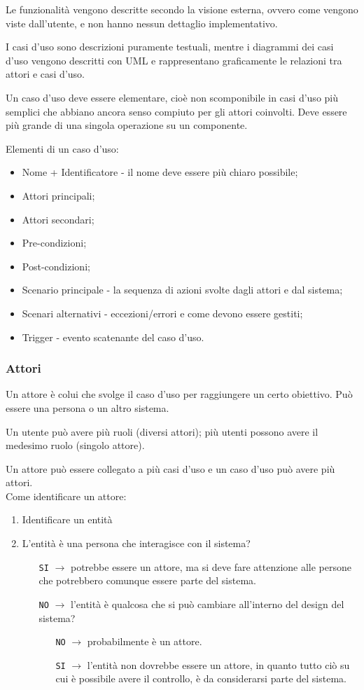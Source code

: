 Le funzionalità vengono descritte secondo la visione esterna, ovvero come vengono viste dall'utente, e non hanno nessun dettaglio implementativo.

I casi d'uso sono descrizioni puramente testuali, mentre i diagrammi dei casi d'uso vengono descritti con UML e rappresentano graficamente le relazioni tra attori e casi d'uso.

Un caso d'uso deve essere elementare, cioè non scomponibile in casi d'uso più semplici che abbiano ancora senso compiuto per gli attori coinvolti. 
Deve essere più grande di una singola operazione su un componente. 

Elementi di un caso d'uso:
\begin{itemize}
\item Nome + Identificatore - il nome deve essere più chiaro possibile;
\item Attori principali;
\item Attori secondari;
\item Pre-condizioni;
\item Post-condizioni; 
\item Scenario principale - la sequenza di azioni svolte dagli attori e dal sistema;
\item Scenari alternativi - eccezioni/errori e come devono essere gestiti;
\item Trigger - evento scatenante del caso d'uso.
\end{itemize}

\subsubsection{Attori}

Un attore è colui che svolge il caso d'uso per raggiungere un certo obiettivo. Può essere una persona o un altro sistema. 

Un utente può avere più ruoli (diversi attori); più utenti possono avere il medesimo ruolo (singolo attore). 

Un attore può essere collegato a più casi d'uso e un caso d'uso può avere più attori. \\
Come identificare un attore:
\begin{enumerate}
\item Identificare un entità
\item L'entità è una persona che interagisce con il sistema?
\begin{itemize}
\item[\texttt{SI}] $\to$ potrebbe essere un attore, ma si deve fare attenzione alle persone che potrebbero comunque essere parte del sistema.
\item[\texttt{NO}] $\to$ l'entità è qualcosa che si può cambiare all'interno del design del sistema?
\begin{itemize}
\item[\texttt{NO}] $\to$ probabilmente è un attore.
\item[\texttt{SI}] $\to$ l'entità non dovrebbe essere un attore, in quanto tutto ciò su cui è possibile avere il controllo, è da considerarsi parte del sistema.
\end{itemize}
\end{itemize}
\end{enumerate}


